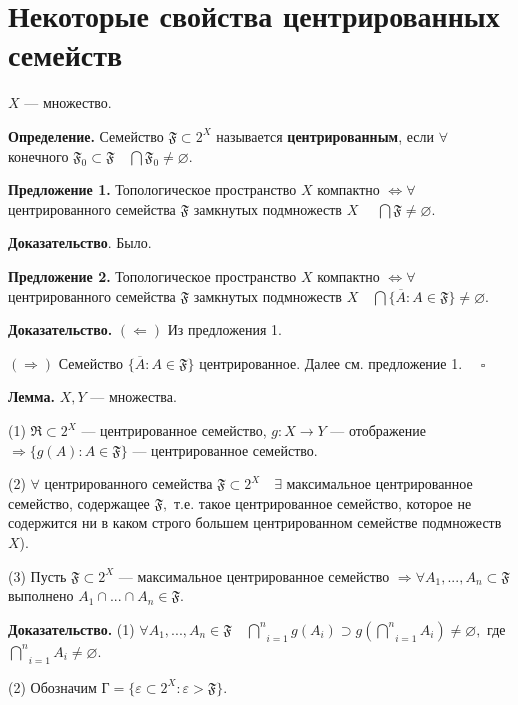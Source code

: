 \documentclass[12pt,a4paper]{article}
\begin{document}
\section{Некоторые свойства центрированных семейств}

$X$ --- множество. 

\textbf{Определение.} Семейство $\mathfrak{F} \subset 2^{X}$ называется \textbf{центрированным}, если $\forall$ конечного $\mathfrak{F}_{0} \subset \mathfrak{F} \quad \bigcap \mathfrak{F}_{0} \neq \varnothing.$ 

\textbf{Предложение 1.} Топологическое пространство $X$ компактно $\Leftrightarrow \forall$ центрированного семейства $\mathfrak{F}$ замкнутых подмножеств $X$ $\quad \bigcap \mathfrak{F} \neq \varnothing.$ 

\textbf{Доказательство}. Было. 

\textbf{Предложение 2.} Топологическое пространство $X$ компактно $\Leftrightarrow \forall$ центрированного семейства $\mathfrak{F}$ замкнутых подмножеств $X \quad \bigcap \{\overline{A}\!: A \in \mathfrak{F}\} \neq \varnothing.$ 

\textbf{Доказательство.} $(\Leftarrow)$ Из предложения 1. 

$(\Rightarrow)$ Семейство $\{\overline{A}\!: A \in \mathfrak{F}\}$ центрированное. Далее см. предложение 1. $\quad \square$

\textbf{Лемма.} $X, Y$ --- множества. 

(1) $\mathfrak{R} \subset 2^{X}$ --- центрированное семейство, $g: X \to Y$ --- отображение $\Rightarrow \{g(A)\!: A \in \mathfrak{F}\}$ --- центрированное семейство. 

(2) $\forall$ центрированного семейства $\mathfrak{F} \subset 2^{X} \quad \exists$ максимальное центрированное семейство, содержащее $\mathfrak{F},$ т.е. такое центрированное семейство, которое не содержится ни в каком строго большем центрированном семействе подмножеств $X$).

(3) Пусть $\mathfrak{F} \subset 2^{X}$ --- максимальное центрированное семейство $\Rightarrow \forall A_{1}, ..., A_{n} \subset \mathfrak{F}$ выполнено $A_{1} \cap ... \cap A_{n} \in \mathfrak{F}.$ 

\textbf{Доказательство.} (1) $\forall A_{1}, ..., A_{n} \in \mathfrak{F} \quad \underset{i = 1}{\overset{n}{\bigcap}} g(A_{i}) \supset g(\underset{i = 1}{\overset{n}{\bigcap}}A_{i}) \neq \varnothing,$ где $\underset{i = 1}{\overset{n}{\bigcap}} A_{i} \neq \varnothing.$ 

(2) Обозначим $\text{Г} = \{\varepsilon \subset 2^{X}\!: \varepsilon > \mathfrak{F}\}.$
\end{document}
